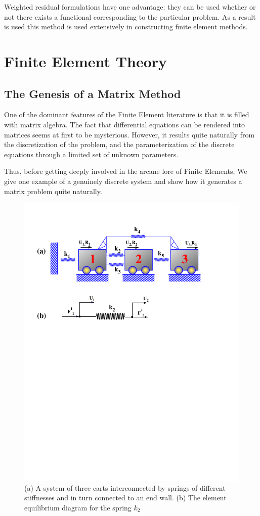 \documentclass[10pt]{article}
\begin{document}
	Weighted residual formulations have one advantage: they can be used
	whether or not there exists a functional corresponding
	to the particular problem.	As a result is used this method is used extensively in 
	constructing finite element methods.		
		
	\section{Finite Element Theory}
	
	\subsection{The Genesis of a Matrix Method}
			
		One of the dominant features of the Finite Element literature
		is that it is filled with matrix algebra. The fact that differential
		equations can be rendered into matrices seems at first to be
		mysterious. However, it results quite naturally from the 
		discretization of the problem, and the parameterization of the
		discrete equations through a limited set of unknown parameters.
		
		Thus, before getting deeply involved in the arcane lore of Finite Elements,
		We give one example of a genuinely discrete system and show
		how it generates a matrix problem quite naturally. 
			
			
			\begin{figure}[h]           
				\begin{center}
		 			 \includegraphics[width=0.66\linewidth]{Diagrams/carts.pdf}
		 			\caption[]{(a) A system of three carts interconnected by springs of different stiffnesses and
		 			in turn connected to an end wall. (b) The element equilibrium diagram for the spring $k_2$}
		 			\label{fig:cart1}
		 		\end{center}
			\end{figure}	
			
\end{document}
